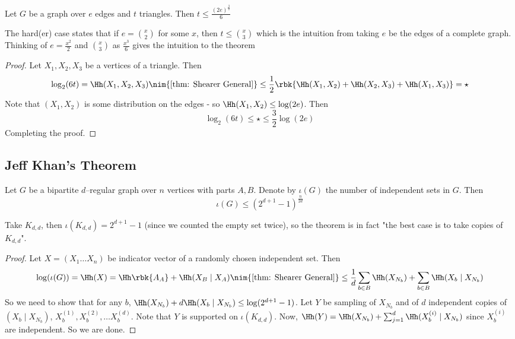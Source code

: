 \documentclass[a4paper, 11pt, oneside]{book}
\begin{document}
\begin{thm}
	\label{thm: Kruskal Katona} Let $G$ be a graph over $e$ edges and $t$ triangles. Then $t\le \frac{(2e)^{\frac{3}{2}}}{6}$
\end{thm}
\begin{remark}
	The hard(er) case states that if $e = {x\choose 2}$ for some $x$, then $t\le {x\choose 3}$ which is the intuition from taking $e$ be the edges of a complete graph. Thinking of $e = \frac{x^2}{2}$ and ${x\choose 3}$ as $\frac{x^3}{6}$ gives the intuition to the theorem
\end{remark}
\begin{proof}
	Let $X_1,X_2,X_3$ be a vertices of a triangle. Then 
	\[
	\log_2(6t) = \Hh(X_1,X_2,X_3)\nim{\ref{thm: Shearer General}}\le\frac{1}{2}\rbk{\Hh(X_1,X_2) + \Hh(X_2,X_3) + \Hh(X_1,X_3)} = \star
	\]
	Note that $(X_1,X_2)$ is some distribution on the edges - so $\Hh(X_1,X_2)\le \log(2e)$. Then
	\[
	\log_2(6t) \le \star \le \frac{3}{2}\log(2e)
	\]
	Completing the proof.
\end{proof}
\subsection{Jeff Khan's Theorem}
\begin{thm}\label{thm: Jeff Khan}
	Let $G$ be a bipartite $d$--regular graph over $n$ vertices with parts $A,B$. Denote by $\iota(G)$ the number of independent sets in $G$. Then 
	\[
	\iota(G) \le (2^{d+1}-1)^{\frac{n}{2d}}
	\]
\end{thm}
\begin{remark}
	Take $K_{d,d}$, then $\iota(K_{d,d}) = 2^{d+1}-1$ (since we counted the empty set twice), so the theorem is in fact "the best case is to take copies of $K_{d,d}$".
\end{remark}

\begin{proof}
	Let $X = (X_1\ldots X_n)$ be indicator vector of a randomly chosen independent set. Then 
	\[
	\log(\iota(G)) = \Hh(X) = \Hh\rbk{A_A} + \Hh(X_B\mid X_A)\nim{\ref{thm: Shearer General}}\le \frac{1}{d}\sum_{b\in B}\Hh(X_{N_b}) + \sum_{b\in B}\Hh(X_b\mid X_{N_b})
	\]
	So we need to show that for any $b$, $\Hh(X_{N_b}) + d\Hh(X_b\mid X_{N_b}) \le \log(2^{d+1}-1)$. Let $Y$ be sampling of $X_{N_b}$ and of $d$ independent copies of $(X_b\mid X_{N_b})$, $X_b^{(1)},X_b^{(2)},\ldots X_b^{(d)}$. Note that $Y$ is supported on $\iota(K_{d,d})$. Now, $\Hh(Y) = \Hh(X_{N_b}) + \sum_{j=1}^d \Hh(X_b^{(i)}\mid X_{N_b})$ since $X_b^{(i)}$ are independent. So we are done.
\end{proof}
\end{document}
